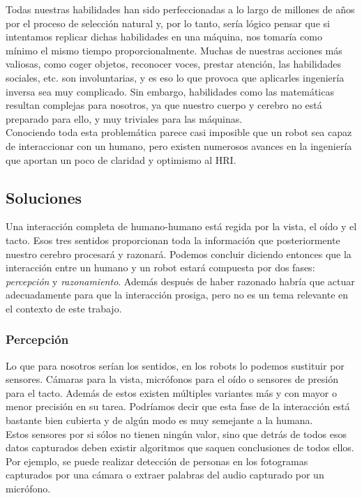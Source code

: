 Todas nuestras habilidades han sido perfeccionadas a lo largo de millones de años por el proceso de selección natural y, por lo tanto, sería lógico pensar que si intentamos replicar dichas habilidades en una máquina, nos tomaría como mínimo el mismo tiempo proporcionalmente. Muchas de nuestras acciones más valiosas, como coger objetos, reconocer voces, prestar atención, las habilidades sociales, etc. son involuntarias, y es eso lo que provoca que aplicarles ingeniería inversa sea muy complicado. Sin embargo, habilidades como las matemáticas resultan complejas para nosotros, ya que nuestro cuerpo y cerebro no está preparado para ello, y muy triviales para las máquinas.\\

Conociendo toda esta problemática parece casi imposible que un robot sea capaz de interaccionar con un humano, pero existen numerosos avances en la ingeniería que aportan un poco de claridad y optimismo al HRI.

\subsection{Soluciones}

Una interacción completa de humano-humano está regida por la vista, el oído y el tacto. Esos tres sentidos proporcionan toda la información que posteriormente nuestro cerebro procesará y razonará. Podemos concluir diciendo entonces que la interacción entre un humano y un robot estará compuesta por dos fases: \textit{percepción} y \textit{razonamiento}. Además después de haber razonado habría que actuar adecuadamente para que la interacción prosiga, pero no es un tema relevante en el contexto de este trabajo. 

\subsubsection{Percepción}
\label{sec:percepcion}

Lo que para nosotros serían los sentidos, en los robots lo podemos sustituir por sensores. Cámaras para la vista, micrófonos para el oído o sensores de presión para el tacto. Además de estos existen múltiples variantes más y con mayor o menor precisión en su tarea. Podríamos decir que esta fase de la interacción está bastante bien cubierta y de algún modo es muy semejante a la humana.\\

Estos sensores por si sólos no tienen ningún valor, sino que detrás de todos esos datos capturados deben existir algoritmos que saquen conclusiones de todos ellos. Por ejemplo, se puede realizar detección de personas en los fotogramas capturados por una cámara o extraer palabras del audio capturado por un micrófono.

